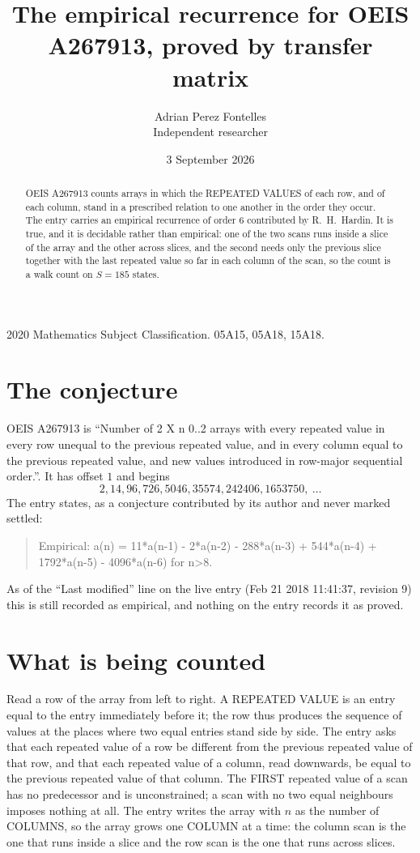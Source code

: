 \documentclass[11pt,a4paper]{article}
\title{The empirical recurrence for OEIS A267913, proved by transfer matrix}
\author{Adrian Perez Fontelles\\ \small Independent researcher}
\date{3 September 2026}
\theoremstyle{plain}
\theoremstyle{definition}
\begin{document}
\maketitle

\begin{abstract}
OEIS A267913 counts arrays in which the REPEATED VALUES of each row, and of each column, stand in a
prescribed relation to one another in the order they occur. The entry carries an empirical
recurrence of order $6$ contributed by R.~H.~Hardin. It is true, and it is decidable
rather than empirical: one of the two scans runs inside a slice of the array and the other
across slices, and the second needs only the previous slice together with the last repeated
value so far in each column of the scan, so the count is a walk count on $S=185$ states.
\end{abstract}

\noindent\small 2020 Mathematics Subject Classification. 05A15, 05A18, 15A18.\normalsize

\section{The conjecture}

OEIS A267913 is ``Number of 2 X n 0..2 arrays with every repeated value in every row unequal to the previous repeated value, and in every column equal to the previous repeated value, and new values introduced in row-major sequential order.''. It has offset $1$ and begins
\[
2, 14, 96, 726, 5046, 35574, 242406, 1653750,\ \dots
\]
The entry states, as a conjecture contributed by its author and never marked settled:
\begin{quote}
Empirical: a(n) = 11*a(n-1) - 2*a(n-2) - 288*a(n-3) + 544*a(n-4) + 1792*a(n-5) - 4096*a(n-6) for n>8.
\end{quote}
As of the ``Last modified'' line on the live entry (Feb 21 2018 11:41:37, revision 9) this is still
recorded as empirical, and nothing on the entry records it as proved.

\section{What is being counted}

Read a row of the array from left to right. A REPEATED VALUE is an entry equal to the entry
immediately before it; the row thus produces the sequence of values at the places where two
equal entries stand side by side. The entry asks that each repeated value of a row be
different from the previous repeated value of that row, and that each repeated value of a column,
read downwards, be equal to the previous repeated value of that column. The FIRST repeated
value of a scan has no predecessor and is unconstrained; a scan with no two equal neighbours
imposes nothing at all. The entry writes the array with $n$ as the number of COLUMNS, so the array grows one COLUMN at a time: the column scan is the one that runs inside a slice and the row scan is the one that runs across slices.
\end{document}

